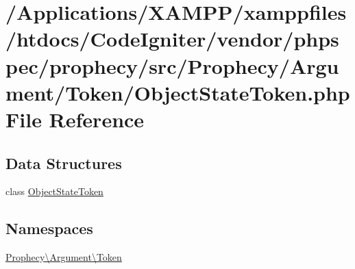 \hypertarget{_object_state_token_8php}{}\section{/\+Applications/\+X\+A\+M\+P\+P/xamppfiles/htdocs/\+Code\+Igniter/vendor/phpspec/prophecy/src/\+Prophecy/\+Argument/\+Token/\+Object\+State\+Token.php File Reference}
\label{_object_state_token_8php}
\subsection*{Data Structures}
\begin{DoxyCompactItemize}
\item 
class \mbox{\hyperlink{class_prophecy_1_1_argument_1_1_token_1_1_object_state_token}{Object\+State\+Token}}
\end{DoxyCompactItemize}
\subsection*{Namespaces}
\begin{DoxyCompactItemize}
\item 
 \mbox{\hyperlink{namespace_prophecy_1_1_argument_1_1_token}{Prophecy\textbackslash{}\+Argument\textbackslash{}\+Token}}
\end{DoxyCompactItemize}

